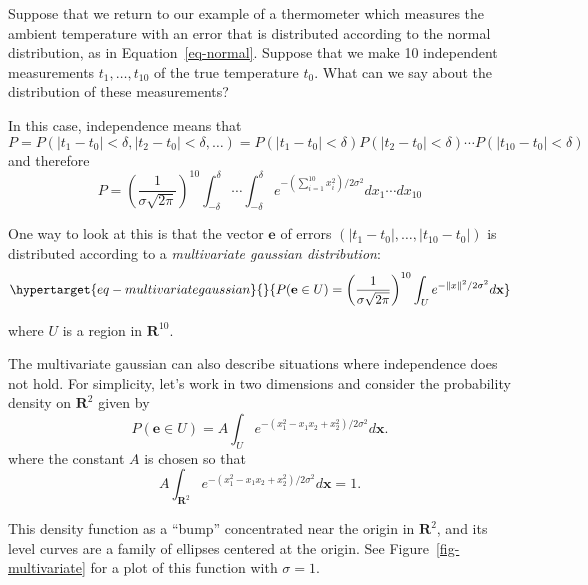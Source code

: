 \documentclass[
  11pt,
  letterpaper,
]{scrbook}
\theoremstyle{plain}
\theoremstyle{plain}
\theoremstyle{remark}
\begin{document}
Suppose that we return to our example of a thermometer which measures
the ambient temperature with an error that is distributed according to
the normal distribution, as in Equation~\ref{eq-normal}. Suppose that we
make 10 independent measurements \(t_1,\ldots, t_{10}\) of the true
temperature \(t_0\). What can we say about the distribution of these
measurements?

In this case, independence means that \[
P=P(|t_1-t_0|<\delta,|t_2-t_0|<\delta,\ldots) = P(|t_1-t_0|<\delta)P(|t_2-t_0|<\delta)\cdots P(|t_{10}-t_{0}|<\delta)
\] and therefore \[
P = \left(\frac{1}{\sigma\sqrt{2\pi}}\right)^{10}\int_{-\delta}^{\delta}\cdots\int_{-\delta}^{\delta}
e^{-(\sum_{i=1}^{10} x_i^2)/2\sigma^2} dx_1\cdots dx_{10}
\]

One way to look at this is that the vector \(\mathbf{e}\) of errors
\((|t_1-t_0|,\ldots,|t_{10}-t_0|)\) is distributed according to a
\emph{multivariate gaussian distribution}:
\begin{equation}\protect\hypertarget{eq-multivariategaussian}{}{
P(\mathbf{e}\in U) =\left(\frac{1}{\sigma\sqrt{2\pi}}\right)^{10}\int_{U}
e^{-\|x\|^2/2\sigma^2} d\mathbf{x}
}\label{eq-multivariategaussian}\end{equation}

where \(U\) is a region in \(\mathbf{R}^{10}\).

The multivariate gaussian can also describe situations where
independence does not hold. For simplicity, let's work in two dimensions
and consider the probability density on \(\mathbf{R}^{2}\) given by \[
P(\mathbf{e}\in U) = A\int_{U} e^{-(x_1^2-x_1x_2+x_2^2)/2\sigma^2} d\mathbf{x}.
\] where the constant \(A\) is chosen so that \[
A\int_{\mathbf{R}^{2}}e^{-(x_1^2-x_1x_2+x_2^2)/2\sigma^2}d\mathbf{x} = 1.
\]

This density function as a ``bump'' concentrated near the origin in
\(\mathbf{R}^{2}\), and its level curves are a family of ellipses
centered at the origin. See Figure~\ref{fig-multivariate} for a plot of
this function with \(\sigma=1\).
\end{document}

